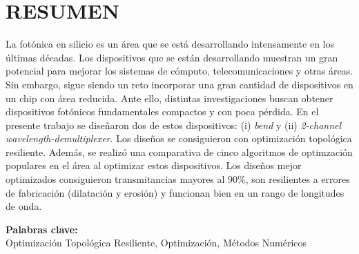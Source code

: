 \chapter*{\center \Large \vspace{-4.5cm} RESUMEN}

La fotónica en silicio es un área que se está desarrollando intensamente en los últimas décadas.
Los dispositivos que se están desarrollando muestran un gran potencial para mejorar
los sistemas de cómputo, telecomunicaciones y otras áreas.
Sin embargo, sigue siendo un reto incorporar una gran cantidad de dispositivos en un chip con área
reducida.
Ante ello, distintas investigaciones buscan obtener dispositivos fotónicos fundamentales compactos
y con poca pérdida. En el presente trabajo se diseñaron dos de estos dispositivos:
(i) \emph{bend} y (ii) \emph{2-channel wavelength-demultiplexer}.
Los diseños se consiguieron con optimización 
topológica resiliente.
Además, se realizó una comparativa de cinco algoritmos de optimzación populares en el área al optimizar
estos dispositivos.
Los diseños mejor optimizados consiguieron transmitancias mayores al $90 \%$, son resilientes a errores
de fabricación (dilatación y erosión) y funcionan bien en un rango de longitudes de onda.

\noindent \textbf{Palabras clave:}\\
\noindent Optimización Topológica Resiliente, Optimización, Métodos Numéricos
